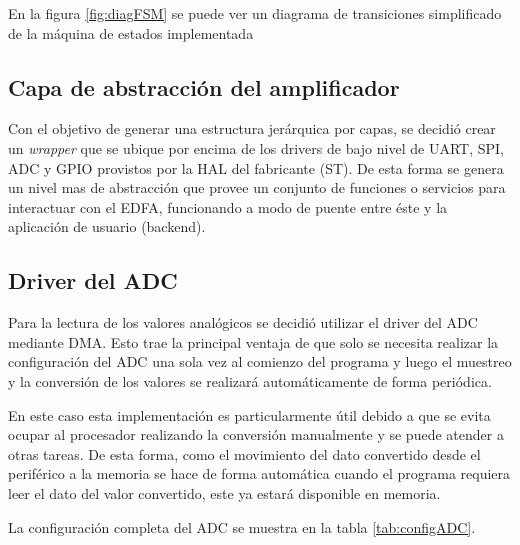En la figura \ref{fig:diagFSM} se puede ver un diagrama de transiciones simplificado de la máquina de estados implementada 


\subsection{Capa de abstracción del amplificador}

Con el objetivo de generar una estructura jerárquica por capas, se decidió crear un \textit{wrapper} que se ubique por encima de los drivers de bajo nivel de UART, SPI, ADC y GPIO provistos por la HAL del fabricante (ST). De esta forma se genera un nivel mas de abstracción que provee un conjunto de funciones o servicios para interactuar con el EDFA, funcionando a modo de puente entre éste y la aplicación de usuario (backend).


\subsection{Driver del ADC}

Para la lectura de los valores analógicos se decidió utilizar el driver del ADC mediante DMA. Esto trae la principal ventaja de que solo se necesita realizar la configuración del ADC una sola vez al comienzo del programa y luego el muestreo y la conversión de los valores se realizará automáticamente de forma periódica.

En este caso esta implementación es particularmente útil debido a que se evita ocupar al procesador realizando la conversión manualmente y se puede atender a otras tareas. De esta forma, como el movimiento del dato convertido desde el periférico a la memoria se hace de forma automática cuando el programa requiera leer el dato del valor convertido, este ya estará disponible en memoria.

La configuración completa del ADC se muestra en la tabla \ref{tab:configADC}.



